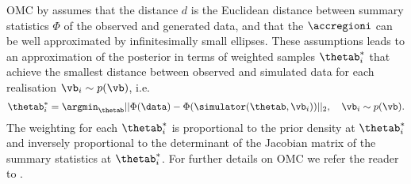 OMC by \citet{Meeds2015} assumes that the distance $d$ is the
Euclidean distance between summary statistics $\Phi$ of the observed
and generated data, and that the $\accregioni$ can be well
approximated by infinitesimally small ellipses. These assumptions leads to an approximation of the posterior in
terms of weighted samples $\thetab_i^*$ that achieve the smallest
distance between observed and simulated data for each realisation
$\vb_i \sim p(\vb)$, i.e.\
\begin{equation} \label{eq:omc_opt_prob}
\thetab_i^* = \argmin_{\thetab} ||\Phi(\data)-\Phi(\simulator(\thetab, \vb_i))||_2  , \quad \vb_i \sim p(\vb).
\end{equation}
The weighting for each $\thetab_i^*$ is proportional to the prior
density at $\thetab_i^*$ and inversely proportional to the determinant
of the Jacobian matrix of the summary statistics at $\thetab_i^*$. For
further details on OMC we refer the reader to \citep{Meeds2015,
Ikonomov2019}.

